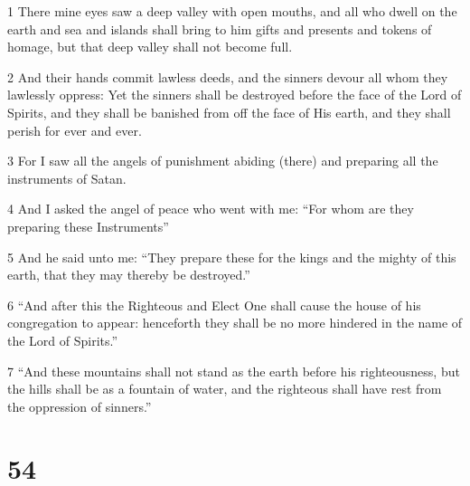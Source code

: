 \par 1 There mine eyes saw a deep valley with open mouths, and all who dwell on the earth and sea and islands shall bring to him gifts and presents and tokens of homage, but that deep valley shall not become full.
\par 2 And their hands commit lawless deeds, and the sinners devour all whom they lawlessly oppress: Yet the sinners shall be destroyed before the face of the Lord of Spirits, and they shall be banished from off the face of His earth, and they shall perish for ever and ever.
\par 3 For I saw all the angels of punishment abiding (there) and preparing all the instruments of Satan.
\par 4 And I asked the angel of peace who went with me: “For whom are they preparing these Instruments”
\par 5 And he said unto me: “They prepare these for the kings and the mighty of this earth, that they may thereby be destroyed.”
\par 6 “And after this the Righteous and Elect One shall cause the house of his congregation to appear: henceforth they shall be no more hindered in the name of the Lord of Spirits.”
\par 7 “And these mountains shall not stand as the earth before his righteousness, but the hills shall be as a fountain of water, and the righteous shall have rest from the oppression of sinners.”

\chapter{54}

